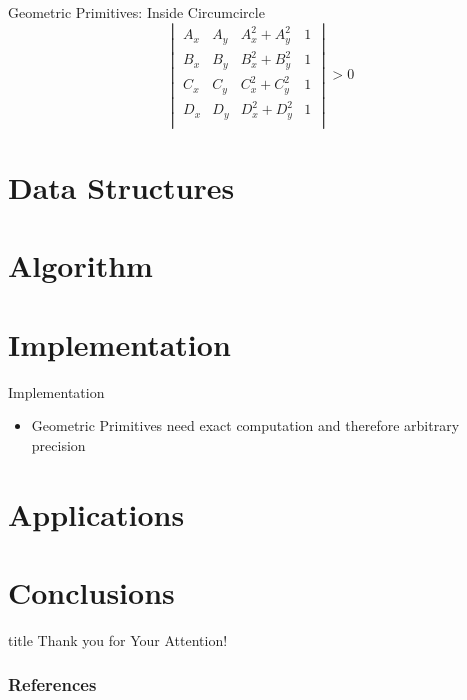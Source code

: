 \documentclass[aspectratio=169]{beamer}
\begin{document}
\begin{frame}{Geometric Primitives: Inside Circumcircle}
  \[
    \begin{vmatrix}
      A_x & A_y & A_x^2 + A_y^2 & 1 \\
      B_x & B_y & B_x^2 + B_y^2 & 1 \\
      C_x & C_y & C_x^2 + C_y^2 & 1 \\
      D_x & D_y & D_x^2 + D_y^2 & 1 \\
    \end{vmatrix}
    > 0
  \]
\end{frame}

\section{Data Structures}

\section{Algorithm}

\section{Implementation}
\begin{frame}{Implementation}
  \begin{itemize}
    \item Geometric Primitives need exact computation and therefore arbitrary precision
  \end{itemize}
\end{frame}

\section{Applications}

\section{Conclusions}

\begin{frame}
  \vfill
  \centering
  \begin{beamercolorbox}[sep=8pt,center,shadow=true,rounded=true]{title}
    Thank you for Your Attention!%
    \par%
  \end{beamercolorbox}
  \vfill
\end{frame}

\begin{frame}
  \frametitle{References}
  \AtNextBibliography{\tiny}
  \begin{multicols}{2}
    \nocite{*}
    \printbibliography
  \end{multicols}
\end{frame}
\end{document}

